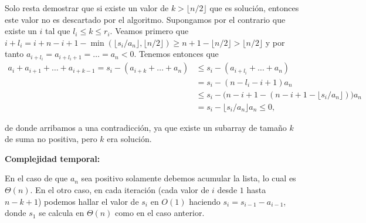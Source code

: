 \documentclass[10pt]{amsart}
\theoremstyle{definition}
\numberwithin{equation}{section}
\begin{document}
{		Solo resta demostrar que si existe un valor de $k > \lfloor n/2 \rfloor$ que es soluci\'on, entonces este valor no es descartado por el algoritmo. Supongamos por el contrario que existe un $i$ tal que $l_i \le k \le r_i$. Veamos primero  que $i + l_i = i + n - i  + 1 - \min( \lfloor s_i/a_n \rfloor, \lfloor n/2 \rfloor) \ge n + 1 - \lfloor n/2 \rfloor > \lfloor n/2 \rfloor$ y por tanto $a_{i + l_i} = a_{i + l_i + 1} = \dots = a_n < 0$.  Tenemos entonces que
		 \begin{align*}
		 a_i + a_{i + 1} + \dots + a_{ i + k - 1} =  s_i - (a_{i + k} + \dots + a_n) 
		 &\le s_i - (a_{i + l_i} + \dots + a_n) 
		 \\& = s_i - (n - l_i - i + 1 )a_n 
		 \\ & \le s_i - \big (n - i + 1- (n - i + 1 - \lfloor s_i / a_n \rfloor) \big)a_n
		 \\ & = s_i - \lfloor s_i / a_n \rfloor a_n 
		 \le 0, 
		 \end{align*}
	 
	de donde arribamos a una contradicci\'on, ya que existe un subarray de tama\~no $k$ de suma no positiva, pero $k$ era soluci\'on.
 		
 		
 		
 		
 	}
 		
		 \textbf{Complejidad temporal:}
		 
		 En el caso de que $a_n$ sea positivo solamente debemos acumular la lista, lo cual es $\Theta(n)$. En el otro caso, en cada iteraci\'on (cada valor de $i$ desde $1$ hasta $n - k + 1$) podemos hallar el valor de $s_i$ en $O(1)$ haciendo $s_{i} = s_{i - 1} - a_{i-1}$, donde $s_1$ se calcula en $\Theta(n)$ como en el caso anterior. 
		 
\end{document}
